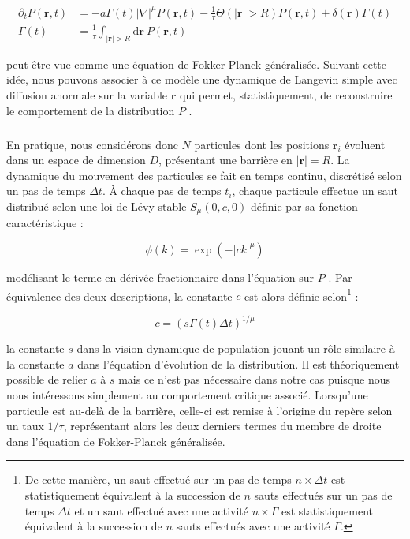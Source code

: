 \begin{equation}
\begin{aligned}
    \partial_t P(\mathbf{r}, t) &= -a\Gamma (t)|\nabla|^{\mu} P(\mathbf{r}, t) - \frac{1}{\tau}\Theta(|\mathbf{r}|>R)P(\mathbf{r}, t) + \delta(\mathbf{r})\Gamma (t)\\
     \Gamma (t) &= \frac{1}{\tau}\int_{|\mathbf{r}|>R}\mathrm{d}\mathbf{r}~P(\mathbf{r}, t)
\end{aligned}
\end{equation}

\noindent peut être vue comme une équation de Fokker-Planck généralisée. Suivant cette idée, nous pouvons associer à ce modèle une dynamique de Langevin simple avec diffusion anormale sur la variable $\mathbf{r}$ qui permet, statistiquement, de reconstruire le comportement de la distribution $P$ \cite{chechkin_fundamentals_2006}.

\subparagraph{}En pratique, nous considérons donc $N$ particules dont les positions $\mathbf{r}_i$ évoluent dans un espace de dimension $D$, présentant une barrière en $|\mathbf{r}|=R$. La dynamique du mouvement des particules se fait en temps continu, discrétisé selon un pas de temps $\Delta t$. \`A chaque pas de temps $t_i$, chaque particule effectue un saut distribué selon une loi de Lévy stable $S_\mu(0,c,0)$ définie par sa fonction caractéristique :

\begin{equation}
	\phi(k) = \exp (-|ck|^\mu)
\end{equation}

\noindent modélisant le terme en dérivée fractionnaire dans l'équation sur $P$ \cite{hinrichsen_non_equilibrium_2007, jespersen_levy_1999}. Par équivalence des deux descriptions, la constante $c$ est alors définie selon\footnote{De cette manière, un saut effectué sur un pas de temps $n\times\Delta t$ est statistiquement équivalent à la succession de $n$ sauts effectués sur un pas de temps $\Delta t$ et un saut effectué avec une activité $n\times \Gamma$ est statistiquement équivalent à la succession de $n$ sauts effectués avec une activité $\Gamma$.} :

\begin{equation}
	c = \left( s \Gamma(t) \Delta t \right)^{1/\mu}
\end{equation}

\noindent la constante $s$ dans la vision dynamique de population jouant un rôle similaire à la constante $a$ dans l'équation d'évolution de la distribution. Il est théoriquement possible de relier $a$ à $s$ mais ce n'est pas nécessaire dans notre cas puisque nous nous intéressons simplement au comportement critique associé. Lorsqu'une particule est au-delà de la barrière, celle-ci est remise à l'origine du repère selon un taux $1/\tau$, représentant alors les deux derniers termes du membre de droite dans l'équation de Fokker-Planck généralisée.

